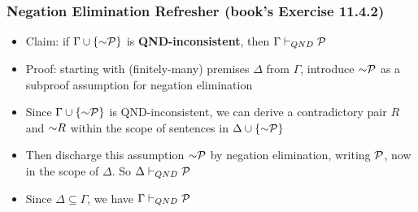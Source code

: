 \begin{frame}
\frametitle{Negation Elimination Refresher (book's Exercise 11.4.2)}

\begin{itemize}

\item Claim: if $\Gamma \cup \{\enot \metav{P}\}$ is \textbf{\textcolor{OGlyallpink}{QND-inconsistent}}, then $\Gamma \vdash_{QND} \mathcal{P}$

\item Proof: starting with (finitely-many) premises $\Delta$ from $\Gamma$, introduce $\enot \metav{P}$ as a subproof assumption for negation elimination

\item Since $\Gamma \cup \{\enot \metav{P}\}$ is QND-inconsistent, we can derive a contradictory pair $R$ and $\enot R$ within the scope of sentences in $\Delta \cup \{\enot \metav{P}\}$

\item Then discharge this assumption $\enot \metav{P}$ by negation elimination, writing $\mathcal{P}$, now in the scope of $\Delta$. So $\Delta \vdash_{QND} \mathcal{P}$

\item Since $\Delta \subseteq \Gamma$, we have $\Gamma \vdash_{QND} \mathcal{P}$




\end{itemize}
\end{frame}

